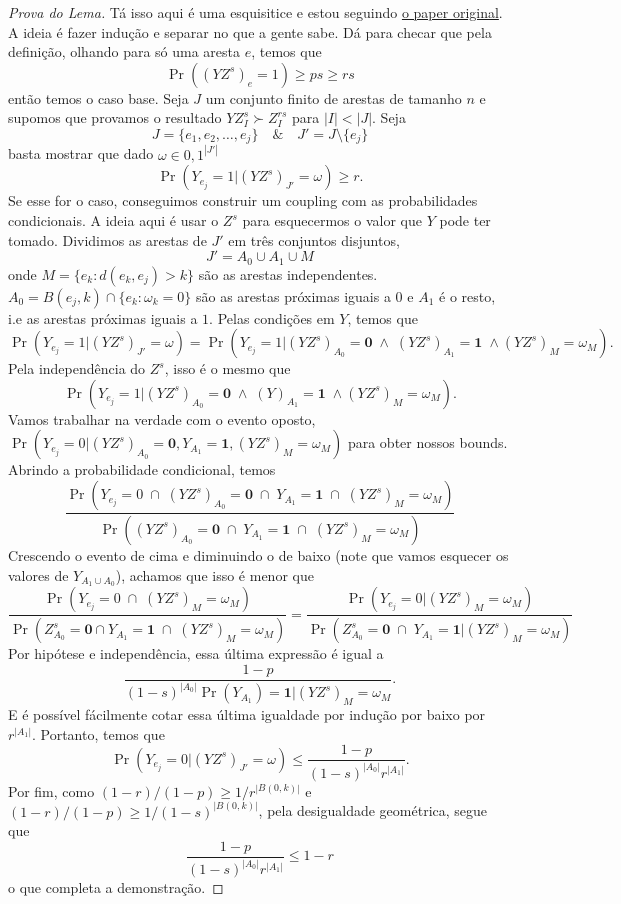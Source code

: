 \begin{proof}[Prova do Lema]
	Tá isso aqui é uma esquisitice e estou seguindo
	\href{https://sci-hub.box/10.1214/aop/1024404279}{o paper original}.
	A ideia é fazer indução e separar no que a gente sabe.
	Dá para checar que pela definição, olhando para só uma aresta $e$, temos que
	\[
		\Pr((YZ^s)_e = 1) \geq ps \geq rs
	\]
	então temos o caso base. Seja $J$ um conjunto finito de arestas de
	tamanho $n$ e supomos
	que provamos o resultado $YZ^s_I \succ Z^{rs}_I$ para $|I| < |J|$. Seja
	\[
		J = \{e_1, e_2, \dots, e_{j}\} \quad \& \quad J' = J \setminus \{e_j\}
	\]
	basta mostrar que dado $\omega \in {0,1}^{|J'|}$
	\[
		\Pr(Y_{e_j} = 1 | (YZ^{s})_{J'} = \omega) \geq r.
	\]
	Se esse for o caso, conseguimos construir um coupling com as
	probabilidades condicionais.
	A ideia aqui é usar o $Z^s$ para esquecermos o valor que $Y$ pode ter tomado.
	Dividimos as arestas de $J'$ em três conjuntos disjuntos,
	\[
		J' = A_0 \cup A_1 \cup M
	\]
	onde $M = \{e_k : d(e_k, e_j) > k\}$ são as arestas independentes.
	$A_0 = B(e_j, k) \cap \{e_k : \omega_k = 0\}$
	são as arestas próximas iguais a $0$ e $A_1$ é o resto, i.e as
	arestas próximas iguais a $1$.
	Pelas condições em $Y$, temos que
	\[
		\Pr(Y_{e_j} = 1 | (YZ^s)_{J'} = \omega) = \Pr(Y_{e_j} = 1 |
			(YZ^s)_{A_0} = \bm{0} \; \land \; (YZ^s)_{A_1} = \bm{1} \; \land
		(YZ^s)_M = \omega_{M}).
	\]
	Pela independência do $Z^s$, isso é o mesmo que
	\[
		\Pr(Y_{e_j} = 1 | (YZ^s)_{A_0} = \bm{0} \; \land \; (Y)_{A_1} =
		\bm{1} \; \land (YZ^s)_M = \omega_{M}).
	\]
	Vamos trabalhar na verdade com o evento oposto,
	$\Pr(Y_{e_j} = 0 | (YZ^s)_{A_0} = \bm{0}, Y_{A_1} = \bm{1}, (YZ^s)_M
	= \omega_M)$ para
	obter nossos bounds. Abrindo a probabilidade condicional, temos
	\[
		\frac{\Pr(Y_{e_j} = 0 \; \cap\; (YZ^s)_{A_0} = \bm{0} \;\cap\;
		Y_{A_1} = \bm{1} \;\cap\; (YZ^s)_M = \omega_M)}
		{\Pr((YZ^s)_{A_0} = \bm{0} \;\cap\; Y_{A_1} = \bm{1} \;\cap\;
		(YZ^s)_M = \omega_M)}
	\]
	Crescendo o evento de cima e diminuindo o de baixo (note
	que vamos esquecer os valores de $Y_{A_1 \cup A_0}$),
	achamos que isso é menor que
	\[
		\frac{\Pr(Y_{e_j} = 0 \;\cap \; (YZ^s)_M = \omega_M)}
		{\Pr(Z^s_{A_0} = \bm{0} \cap Y_{A_1} = \bm{1} \;\cap\; (YZ^s)_M = \omega_M)}
		= \frac{\Pr(Y_{e_j} = 0 | (YZ^s)_M = \omega_M)}
		{\Pr(Z^s_{A_0} = \bm{0} \; \cap \; Y_{A_1} = \bm{1} | (YZ^s)_{M} = \omega_M)}
	\]
	Por hipótese e independência, essa última expressão é igual a
	\[
		\frac{1-p}{(1-s)^{|A_0|} \Pr(Y_{A_1}) = \bm{1} | (YZ^s)_{M} = \omega_M}.
	\]
	E é possível fácilmente cotar essa última igualdade por indução por baixo por
	$r^{|A_1|}$. Portanto, temos que
	\[
		\Pr(Y_{e_j} = 0 | (YZ^s)_{J'} = \omega) \leq
		\frac{1-p}{(1-s)^{|A_0|}r^{|A_1|}}.
	\]
	Por fim, como $(1-r)/(1-p) \geq 1/r^{|B(0,k)|}$ e $(1-r)/(1-p) \geq
	1/(1-s)^{|B(0,k)|}$,
	pela desigualdade geométrica, segue que
	\[
		\frac{1-p}{(1-s)^{|A_0|}r^{|A_1|}} \leq 1-r
	\]
	o que completa a demonstração.
\end{proof}
